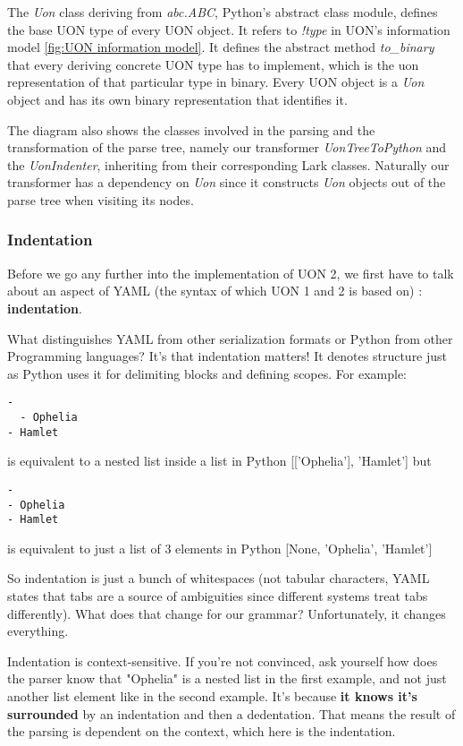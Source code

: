 \documentclass[12pt]{article}
\begin{document}
The \emph{Uon} class deriving from \emph{abc.ABC}, Python's abstract class module, defines the base UON type of every UON object. It refers to \emph{!type} in UON's information model \ref{fig:UON information model}. It defines the abstract method \emph{to\_binary} that every deriving concrete UON type has to implement, which is the uon representation of that particular type in binary. Every UON object is a \emph{Uon} object and has its own binary representation that identifies it.

The diagram also shows the classes involved in the parsing and the transformation of the parse tree, namely our transformer \emph{UonTreeToPython} and the \emph{UonIndenter}, inheriting from their corresponding Lark classes. Naturally our transformer has a dependency on \emph{Uon} since it constructs \emph{Uon} objects out of the parse tree when visiting its nodes.

\pagebreak

\subsubsection{Indentation}\label{section:indent}
Before we go any further into the implementation of UON 2, we first have to talk about an aspect of YAML (the syntax of which UON 1 and 2 is based on) : \textbf{indentation}.

What distinguishes YAML from other serialization formats or Python from other Programming languages? It's that indentation matters! It denotes structure just as Python uses it for delimiting blocks and defining scopes. For example:
\begin{lstlisting}
- 
  - Ophelia
- Hamlet
\end{lstlisting}
is equivalent to a nested list inside a list in Python [['Ophelia'], 'Hamlet']
but 
\begin{lstlisting}
- 
- Ophelia
- Hamlet
\end{lstlisting}
is equivalent to just a list of 3 elements in Python [None, 'Ophelia', 'Hamlet']

So indentation is just a bunch of whitespaces (not tabular characters, YAML states that tabs are a source of ambiguities since different systems treat tabs differently). What does that change for our grammar? Unfortunately, it changes everything.

Indentation is context-sensitive. If you're not convinced, ask yourself how does the parser know that "Ophelia" is a nested list in the first example, and not just another list element like in the second example. It's because \textbf{it knows it's surrounded} by an indentation and then a dedentation. That means the result of the parsing is dependent on the context, which here is the indentation.
\end{document}
